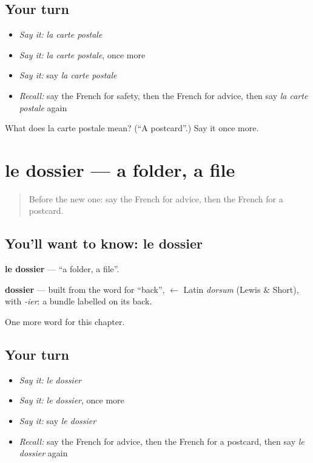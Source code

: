 \subsection*{Your turn}
\begin{itemize}
\raggedright
  \item \emph{Say it:} \emph{la carte postale}
  \item \emph{Say it:} \emph{la carte postale}, once more
  \item \emph{Say it:} say \emph{la carte postale}
  \item \emph{Recall:} say the French for safety, then the French for advice, then say \emph{la carte postale} again
\end{itemize}

\begin{tcolorbox}[breakable,colback=teal!4,colframe=teal!35!black,title={Before you move on}]
What does la carte postale mean? (\textquotedblleft{}A postcard\textquotedblright{}.) Say it once more.
\end{tcolorbox}
\section[le dossier]{le dossier — a folder, a file}

\label{lesson:FR-C169-dossier}



\begin{quote}
Before the new one: say the French for advice, then the French for a postcard.
\end{quote}

\subsection*{You'll want to know: le dossier}
\textbf{le dossier} — \textquotedblleft{}a folder, a file\textquotedblright{}.

\begin{cousinweb}
\textbf{dossier} — built from the word for \textquotedblleft{}back\textquotedblright{}, $\leftarrow$ Latin \emph{dorsum} (Lewis \& Short), with \emph{-ier}: a bundle labelled on its back.
\end{cousinweb}

\begin{grammarlens}[title={What you've built}]
One more word for this chapter.
\end{grammarlens}

\subsection*{Your turn}
\begin{itemize}
\raggedright
  \item \emph{Say it:} \emph{le dossier}
  \item \emph{Say it:} \emph{le dossier}, once more
  \item \emph{Say it:} say \emph{le dossier}
  \item \emph{Recall:} say the French for advice, then the French for a postcard, then say \emph{le dossier} again
\end{itemize}

